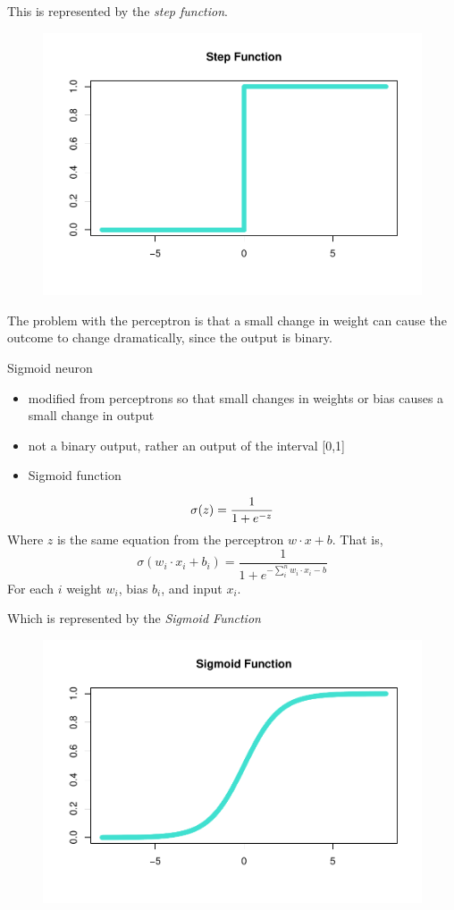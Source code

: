 This is represented by the \emph{step function}.

\begin{figure}[H]
    \centering
    \includegraphics[width = .7\textwidth]{Figures/step-function-1.pdf}
    \vspace{-40pt}
\end{figure}

The problem with the perceptron is that a small change in weight can
cause the outcome to change dramatically, since the output is binary.

Sigmoid neuron

\begin{itemize}
\tightlist
\item
  modified from perceptrons so that small changes in weights or bias
  causes a small change in output
\item
  not a binary output, rather an output of the interval {[}0,1{]}
\item
  Sigmoid function
\end{itemize}

\[
\sigma(z) = \frac{1}{1+e^{-z}} \\
\] Where \(z\) is the same equation from the perceptron
\(w \cdot x + b\). That is, \[
\sigma(w_i \cdot x_i + b_i) = \frac{1}{1+e^{-\sum_i^n w_i \cdot x_i - b}}
\] For each \(i\) weight \(w_i\), bias \(b_i\), and input \(x_i\).

Which is represented by the \emph{Sigmoid Function}

\begin{figure}[H]
    \centering
    \includegraphics[width = .7\textwidth]{Figures/sigmoid-function-1.pdf}
   \vspace{-40pt}
\end{figure}

